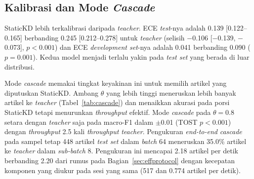 \documentclass{ieeeaccess}
\newcommand{\en}[1]{\textit{#1}}
\begin{document}
\subsection{Kalibrasi dan Mode \en{Cascade}}
\label{sec:res-calib}
\begin{table}[!t]
\caption{\en{Cascade} StaticKD dan \en{Teacher} ONNX Int8 pada \en{Test Set}}
\label{tab:cascade}
\centering
\footnotesize
\setlength{\tabcolsep}{2.5pt}
\end{table}
StaticKD lebih terkalibrasi daripada \en{teacher}. ECE \en{test}-nya adalah 0.139 [0.122--0.165] berbanding 0.245 [0.212--0.278] untuk \en{teacher} (selisih $-$0.106 [$-$0.139, $-$0.073], $p<0.001$) dan ECE \en{development set}-nya adalah 0.041 berbanding 0.090 ($p=0.001$). Kedua model menjadi terlalu yakin pada \en{test set} yang berada di luar distribusi.

Mode \en{cascade} memakai tingkat keyakinan ini untuk memilih artikel yang diputuskan StaticKD. Ambang $\theta$ yang lebih tinggi meneruskan lebih banyak artikel ke \en{teacher} (Tabel~\ref{tab:cascade}) dan menaikkan akurasi pada porsi StaticKD tetapi menurunkan \en{throughput} efektif. Mode \en{cascade} pada $\theta=0.8$ setara dengan \en{teacher} saja pada macro-F1 dalam $\pm$0.01 (TOST $p<0.001$) dengan \en{throughput} 2.5 kali \en{throughput} \en{teacher}. Pengukuran \en{end-to-end} \en{cascade} pada sampel tetap 448 artikel \en{test set} dalam \en{batch} 64 meneruskan 35.0\% artikel ke \en{teacher} dalam \en{sub-batch} 8. Pengukuran ini mencapai 2.18 artikel per detik berbanding 2.20 dari rumus pada Bagian~\ref{sec:effprotocol} dengan kecepatan komponen yang diukur pada sesi yang sama (517 dan 0.774 artikel per detik).
\end{document}
